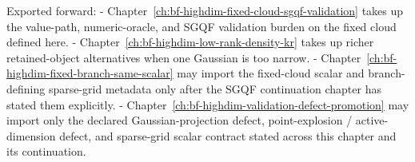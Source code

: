 Exported forward:
- Chapter~\ref{ch:bf-highdim-fixed-cloud-sgqf-validation} takes up the value-path,
  numeric-oracle, and SGQF validation burden on the fixed cloud defined here.
- Chapter~\ref{ch:bf-highdim-low-rank-density-kr} takes up richer retained-object
  alternatives when one Gaussian is too narrow.
- Chapter~\ref{ch:bf-highdim-fixed-branch-same-scalar} may import the fixed-cloud
  scalar and branch-defining sparse-grid metadata only after the SGQF continuation
  chapter has stated them explicitly.
- Chapter~\ref{ch:bf-highdim-validation-defect-promotion} may import only the
  declared Gaussian-projection defect, point-explosion / active-dimension defect,
  and sparse-grid scalar contract stated across this chapter and its continuation.
